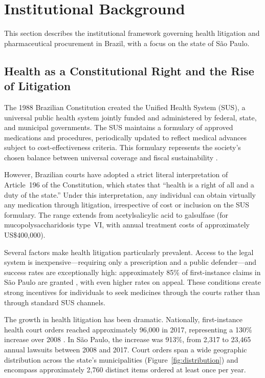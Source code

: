 \section{Institutional Background}
\label{sec:institutional}

This section describes the institutional framework governing health litigation and pharmaceutical procurement in Brazil, with a focus on the state of S\~ao Paulo.

\subsection{Health as a Constitutional Right and the Rise of Litigation}
\label{sec:health_right}

The 1988 Brazilian Constitution created the Unified Health System (SUS), a universal public health system jointly funded and administered by federal, state, and municipal governments. The SUS maintains a formulary of approved medications and procedures, periodically updated to reflect medical advances subject to cost-effectiveness criteria. This formulary represents the society's chosen balance between universal coverage and fiscal sustainability \citep{castro2019, soares2019}.

However, Brazilian courts have adopted a strict literal interpretation of Article~196 of the Constitution, which states that ``health is a right of all and a duty of the state.'' Under this interpretation, any individual can obtain virtually any medication through litigation, irrespective of cost or inclusion on the SUS formulary. The range extends from acetylsalicylic acid to galsulfase (for mucopolysaccharidosis type~VI, with annual treatment costs of approximately US\$400,000).

Several factors make health litigation particularly prevalent. Access to the legal system is inexpensive---requiring only a prescription and a public defender---and success rates are exceptionally high: approximately 85\% of first-instance claims in S\~ao Paulo are granted \citep{cnj2019judicializacao}, with even higher rates on appeal. These conditions create strong incentives for individuals to seek medicines through the courts rather than through standard SUS channels.

The growth in health litigation has been dramatic. Nationally, first-instance health court orders reached approximately 96,000 in 2017, representing a 130\% increase over 2008 \citep{cnj2019judicializacao}. In S\~ao Paulo, the increase was 913\%, from 2,317 to 23,465 annual lawsuits between 2008 and 2017. Court orders span a wide geographic distribution across the state's municipalities (Figure~\ref{fig:distribution}) and encompass approximately 2,760 distinct items ordered at least once per year.

